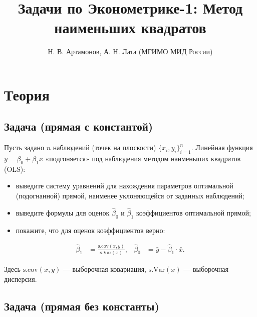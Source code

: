\documentclass[
  russian,
]{article}
\title{Задачи по Эконометрике-1: Метод наименьших квадратов}
\author{Н. В. Артамонов, А. Н. Лата (МГИМО МИД России)}
\date{}
\providecommand{\tightlist}{%
  \setlength{\itemsep}{0pt}\setlength{\parskip}{0pt}}
\renewcommand*\contentsname{Содержание}
\newcommand\contentsname{Содержание}
\begin{document}
\maketitle

\renewcommand*\contentsname{Содержание}
{
\setcounter{tocdepth}{3}
\tableofcontents
}

\section{Теория}\label{ux442ux435ux43eux440ux438ux44f}

\subsection{Задача (прямая с
константой)}\label{ux437ux430ux434ux430ux447ux430-ux43fux440ux44fux43cux430ux44f-ux441-ux43aux43eux43dux441ux442ux430ux43dux442ux43eux439}

Пусть задано \(n\) наблюдений (точек на плоскости)
\(\lbrace x_i,y_i\rbrace_{i=1}^n\). Линейная функция
\(y=\beta_0+\beta_1x\) «подгоняется» под наблюдения методом наименьших
квадратов (OLS):

\begin{itemize}
\tightlist
\item
  выведите систему уравнений для нахождения параметров оптимальной
  (подогнанной) прямой, наименее уклоняющейся от заданных наблюдений;
\item
  выведите формулы для оценок \(\widehat{\beta}_0\) и
  \(\widehat{\beta}_1\) коэффициентов оптимальной прямой;
\item
  покажите, что для оценок коэффициентов верно:
\end{itemize}

\[
\begin{aligned}
  \widehat{\beta}_1&=\frac{\mathrm{s.cov}(x,y)}{\mathrm{s.Var}(x)}, &
  \widehat{\beta}_0&=\bar{y}-\widehat{\beta}_1\cdot \bar{x}.
\end{aligned}
\]

Здесь \(\mathrm{s.cov}(x,y)\) --- выборочная ковариация,
\(\mathrm{s.Var}(x)\) --- выборочная дисперсия.

\subsection{Задача (прямая без
константы)}\label{ux437ux430ux434ux430ux447ux430-ux43fux440ux44fux43cux430ux44f-ux431ux435ux437-ux43aux43eux43dux441ux442ux430ux43dux442ux44b}
\end{document}
